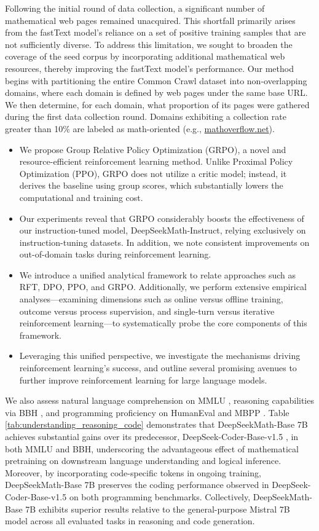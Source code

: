 Following the initial round of data collection, a significant number of mathematical web pages remained unacquired. This shortfall primarily arises from the fastText model's reliance on a set of positive training samples that are not sufficiently diverse. To address this limitation, we sought to broaden the coverage of the seed corpus by incorporating additional mathematical web resources, thereby improving the fastText model's performance. Our method begins with partitioning the entire Common Crawl dataset into non-overlapping domains, where each domain is defined by web pages under the same base URL. We then determine, for each domain, what proportion of its pages were gathered during the first data collection round. Domains exhibiting a collection rate greater than 10\% are labeled as math-oriented (e.g., \url{mathoverflow.net}).

\begin{itemize}[topsep=0pt]
    \item We propose Group Relative Policy Optimization (GRPO), a novel and resource-efficient reinforcement learning method. Unlike Proximal Policy Optimization (PPO), GRPO does not utilize a critic model; instead, it derives the baseline using group scores, which substantially lowers the computational and training cost.
    \item Our experiments reveal that GRPO considerably boosts the effectiveness of our instruction-tuned model, DeepSeekMath-Instruct, relying exclusively on instruction-tuning datasets. In addition, we note consistent improvements on out-of-domain tasks during reinforcement learning.
    \item We introduce a unified analytical framework to relate approaches such as RFT, DPO, PPO, and GRPO. Additionally, we perform extensive empirical analyses—examining dimensions such as online versus offline training, outcome versus process supervision, and single-turn versus iterative reinforcement learning—to systematically probe the core components of this framework.
    \item Leveraging this unified perspective, we investigate the mechanisms driving reinforcement learning’s success, and outline several promising avenues to further improve reinforcement learning for large language models.
\end{itemize}

We also assess natural language comprehension on MMLU \citep{mmlu}, reasoning capabilities via BBH \citep{bbh}, and programming proficiency on HumanEval \citep{codex} and MBPP \citep{mbpp}. Table \ref{tab:understanding_reasoning_code} demonstrates that DeepSeekMath-Base 7B achieves substantial gains over its predecessor, DeepSeek-Coder-Base-v1.5 \citep{deepseek-coder}, in both MMLU and BBH, underscoring the advantageous effect of mathematical pretraining on downstream language understanding and logical inference. Moreover, by incorporating code-specific tokens in ongoing training, DeepSeekMath-Base 7B preserves the coding performance observed in DeepSeek-Coder-Base-v1.5 on both programming benchmarks. Collectively, DeepSeekMath-Base 7B exhibits superior results relative to the general-purpose Mistral 7B model \citep{mistral} across all evaluated tasks in reasoning and code generation.

